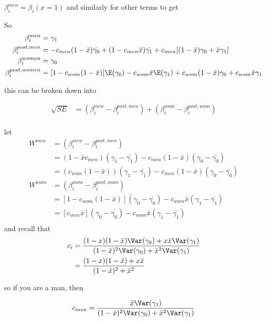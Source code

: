 $\beta_{i}^{men} = \beta_i (x=1)$ and similarly for other terms to get

So 
\begin{align*}
	\beta_i^{men} &= \gamma_1 \\
	\beta_i^{post,men} &= -c_{men} ( 1- \bar{x}) \bar{\gamma_0} + (1 - c_{men}\bar{x}) \bar{\gamma_1} + c_{men} [ (1-\bar{x}) \gamma_0 + \bar{x}\gamma_1] \\
	\beta_i^{women} &= \gamma_0 \\
	\beta_i^{post,women} &= [ 1 - c_{wom}(1-\bar{x}) ]\E(\gamma_0) - c_{wom} \bar{x} \E(\gamma_1) + c_{wom} (1- \bar{x}) \gamma_0 + c_{wom} \bar{x} \gamma_1 \\
\end{align*} 

this can be broken down into

\begin{align*}
	\sqrt{ SE } &= (\beta_i^{men} - \beta_i^{post, men} )+ (\beta_i^{wom} - \beta_i^{post, wom}) \\
\end{align*} 

let 
 \begin{align*}
	 W^{men} &=  (\beta_i^{men} - \beta_i^{post, men}) \\
			&= (1 - \bar{x} c_{men}) (\gamma_1 - \bar{\gamma_1}) - c_{men} ( 1 - \bar{x}) (\gamma_0 - \bar{\gamma_0}) \\
			&= (c_{wom} (1 - \bar{x})) (\gamma_1 - \bar{\gamma_1}) - c_{men} ( 1 - \bar{x}) (\gamma_0 - \bar{\gamma_0}) \\
	 W^{wom} &=  (\beta_i^{wom} - \beta_i^{post, wom}) \\
			 &= [ 1 - c_{wom}(1 - \bar{x}) ] (\gamma_0 - \bar{\gamma_0}) - c_{wom} \bar{x} (\gamma_1 - \bar{\gamma_1}) \\
			 &= [ c_{men} \bar{x}] (\gamma_0 - \bar{\gamma_0}) - c_{wom} \bar{x} (\gamma_1 - \bar{\gamma_1}) \\
\end{align*} 
and recall that
\begin{align*}
	c_{i} &= \frac{(1-x)(1-\bar{x})\Var(\gamma_0) + x\bar{x}\Var(\gamma_1)}{(1-\bar{x})^2\Var(\gamma_0) + \bar{x}^2\Var(\gamma_1)} \\
		  &= \frac{(1-x)(1-\bar{x}) + x\bar{x}}{(1-\bar{x})^2 + \bar{x}^2} 
\end{align*}

so if you are a man, then 

\begin{align*}
	c_{men} =  \frac{\bar{x}\Var(\gamma_1)}{(1-\bar{x})^2\Var(\gamma_0) + \bar{x}^2\Var(\gamma_1)}
\end{align*}

